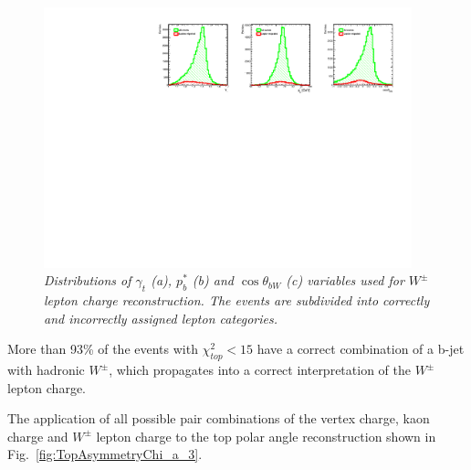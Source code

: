 \begin{figure}[h]
	{\centering
		\includegraphics[width=0.95\textwidth]{ILD/plots/top-lepton-variables.pdf}
		\caption{\sl Distributions of $\gamma_t$ (a), $p^*_b$ (b) and $\cos\theta_{bW}$ (c) variables used for $W^\pm$ lepton charge reconstruction. The events are subdivided into correctly and incorrectly assigned lepton categories.
		}
		\label{fig:TopChiVariables_3}
	}
	
\end{figure}


More than 93\% of the events with $\chi^2_{top} < 15$ have a correct combination of a b-jet with hadronic $W^\pm$, which propagates into a correct interpretation of the $W^\pm$ lepton charge.

The application of all possible pair combinations of the vertex charge, kaon charge and $W^\pm$ lepton charge to the top polar angle reconstruction shown in Fig.~\ref{fig:TopAsymmetryChi_a_3}. 


